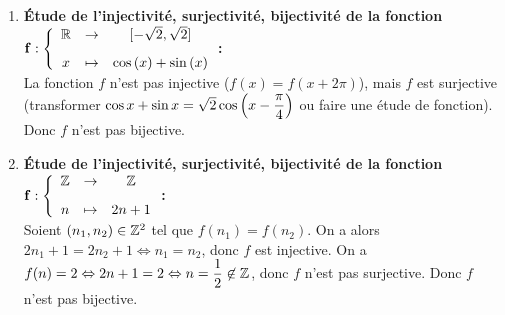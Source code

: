 \documentclass[a4paper, 11pt,reqno]{article}
\begin{document}
\begin{correction}
\begin{enumerate}
\begin{itemize}
		      \end{itemize}
		\item  \textbf{\'Etude de l'injectivit\'e, surjectivit\'e, bijectivit\'e de la fonction $\mathbf{f:\left\lbrace\begin{array}{ccc} \R&\rightarrow& \lbrack -\sqrt{2},\sqrt{2}\rbrack \vsec\\ x & \mapsto & \cos{(x)}+\sin{(x)}\end{array}\right.}$:}\\
		      La fonction $f$ n'est pas injective ($f(x) = f(x+2\pi)$), mais $f$ est surjective (transformer $\cos x + \sin x = \sqrt{2} \cos \left( x - \displaystyle \frac{\pi}{4} \right)$ ou faire une \'etude de fonction). Donc $f$ n'est pas bijective.
		      \noindent
		\item  \textbf{\'Etude de l'injectivit\'e, surjectivit\'e, bijectivit\'e de la fonction $\mathbf{f:\left\lbrace\begin{array}{ccc} \Z&\rightarrow& \Z \vsec\\ n & \mapsto & 2n+1\end{array}\right.}$:}\\
		      Soient $(n_1,n_2) \in \mathbb{Z}^2$ tel que $f(n_1)=f(n_2)$. On a alors $2n_1+1=2n_2+1 \Leftrightarrow n_1=n_2$, donc $f$ est injective.
		      On a $f(n)=2 \Leftrightarrow 2n+1 = 2 \Leftrightarrow n = \displaystyle \frac{1}{2} \not\in \mathbb{Z}$, donc $f$ n'est pas surjective. Donc $f$ n'est pas bijective.
		      \noindent
	\end{enumerate}
\end{correction}
\end{document}
